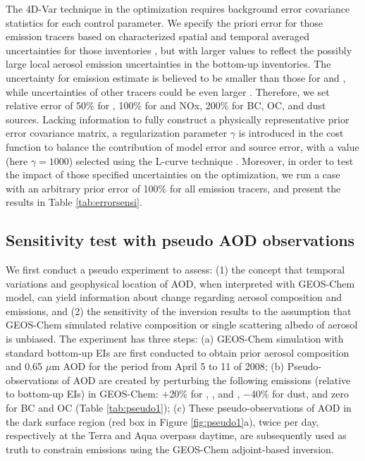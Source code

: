  The 4D-Var technique in the optimization requires background 
 error covariance statistics for each control parameter. 
 We specify the priori error for those emission tracers 
 based on characterized spatial and temporal averaged uncertainties for those inventories 
 \citep{zhang09b,bond07,zender03a},
 but with larger values to reflect the possibly large local aerosol emission 
 uncertainties in the bottom-up inventories. 
 The uncertainty for  emission estimate is believed 
 to be smaller than those for  and , 
 while uncertainties of other tracers could be even larger \citep{textor06,zhang09b}.
 Therefore, we set relative error of 50\% for , 100\% for  and NOx, 
 200\% for BC, OC, and dust sources. 
 Lacking information to fully construct a physically representative 
 prior error covariance matrix, a regularization parameter $\gamma$ 
 is introduced in the cost function to balance the contribution of model error and source error,  with a value (here $\gamma = 1000$) selected using the L-curve technique \citep{hansen98}. 
 Moreover, in order to test the impact of those specified uncertainties on the optimization, 
 we run a case with an arbitrary prior error of 100\% for all emission tracers, 
 and present the results in Table \ref{tab:errorsensi}. 

 \subsection{Sensitivity test with pseudo AOD observations} \label{sec:pseudo}

 We first conduct a pseudo experiment to assess: 
 (1) the concept that temporal variations and geophysical location of AOD, 
 when interpreted with GEOS-Chem model, 
 can yield information about change regarding aerosol composition and emissions, 
 and (2) the sensitivity of the inversion results to the assumption 
 that GEOS-Chem simulated relative composition or single scattering albedo of aerosol is unbiased.
 The experiment has three steps:
 (a) GEOS-Chem simulation with standard bottom-up EIs 
 are first conducted to obtain prior aerosol composition 
 and 0.65 $\mu$m AOD for the period from April 5 to 11 of 2008; 
 (b) Pseudo-observations of AOD are created by perturbing the following emissions 
 (relative to bottom-up EIs) in GEOS-Chem: $+$20\% for , , and , 
 $-$40\% for dust, and zero for BC and OC (Table \ref{tab:pseudo1}); 
 (c) These pseudo-observations of AOD in the dark surface region (red box in Figure \ref{fig:pseudo1}a), 
 twice per day, respectively at the Terra and Aqua overpass daytime, 
 are subsequently used as truth to constrain emissions using the GEOS-Chem adjoint-based inversion. 

